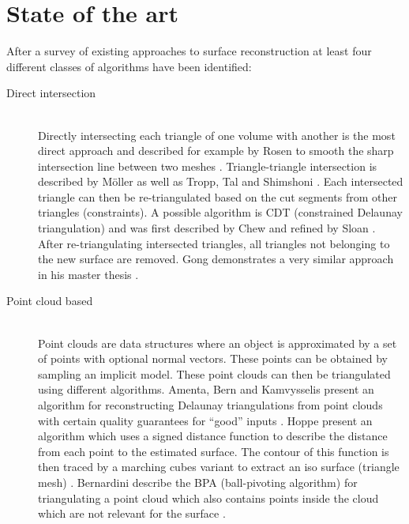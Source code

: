 
\chapter{State of the art}
\label{ch:state_of_the_art}

After a survey of existing approaches to surface reconstruction at least four different classes of algorithms have been identified:

\begin{description}
	
	\item[Direct intersection] \hfill \\
	Directly intersecting each triangle of one volume with another is the most direct approach and described for example by Rosen to smooth the sharp intersection line between two meshes \cite{mesh_intersection}. Triangle-triangle intersection is described by M\"oller \cite{tri_tri_intersection_moller} as well as Tropp, Tal and Shimshoni \cite{tri_tri_intersection_2}. Each intersected triangle can then be re-triangulated based on the cut segments from other triangles (constraints). A possible algorithm is CDT (constrained Delaunay triangulation) and was first described by Chew \cite{CDT} and refined by Sloan \cite{CDT_fast}. After re-triangulating intersected triangles, all triangles not belonging to the new surface are removed. Gong demonstrates a very similar approach in his master thesis \cite{cutter_workpiece_engagement}.
	
	\item[Point cloud based] \hfill \\
	Point clouds are data structures where an object is approximated by a set of points with optional normal vectors. These points can be obtained \eg by sampling an implicit model. These point clouds can then be triangulated using different algorithms. 
	Amenta, Bern and Kamvysselis present an algorithm for reconstructing Delaunay triangulations from point clouds with certain quality guarantees for \enquote{good} inputs \cite{vornoi_surface_reconstruction}.
	Hoppe \etal present an algorithm which uses a signed distance function to describe the distance from each point to the estimated surface. The contour of this function is then traced by a marching cubes variant to extract an iso surface (triangle mesh) \cite{surface_reconstruction}.
	Bernardini \etal describe the BPA (ball-pivoting algorithm) for triangulating a point cloud which also contains points inside the cloud which are not relevant for the surface \cite{BPA}.
	

\end{description}
